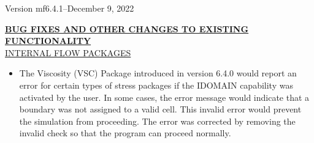 	
	\item Version mf6.4.1--December 9, 2022
	


	\textbf{\underline{BUG FIXES AND OTHER CHANGES TO EXISTING FUNCTIONALITY}} \\


	\underline{INTERNAL FLOW PACKAGES}
	\begin{itemize}
		\item The Viscosity (VSC) Package introduced in version 6.4.0 would report an error for certain types of stress packages if the IDOMAIN capability was activated by the user.  In some cases, the error message would indicate that a boundary was not assigned to a valid cell.  This invalid error would prevent the simulation from proceeding.  The error was corrected by removing the invalid check so that the program can proceed normally.
	\end{itemize}


